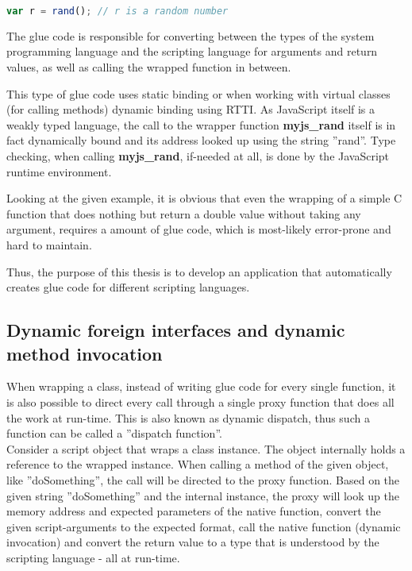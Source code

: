 \begin{lstlisting}[language=JavaScript, caption=Using a C function from SpiderMonkey]
var r = rand();	// r is a random number
\end{lstlisting}

The glue code is responsible for converting between the types of the system programming language and the scripting language for arguments and return values, as well as calling the wrapped function in between.

This type of glue code uses static binding or when working with virtual classes (for calling methods) dynamic binding using RTTI. As JavaScript itself is a weakly typed language, the call to the wrapper function \textbf{myjs\_rand} itself is in fact dynamically bound and its address looked up using the string ''rand''. Type checking, when calling \textbf{myjs\_rand}, if-needed at all, is done by the JavaScript runtime environment.

Looking at the given example, it is obvious that even the wrapping of a simple C function that does nothing but return a double value without taking any argument, requires a  amount of glue code, which is most-likely error-prone and hard to maintain.

Thus, the purpose of this thesis is to develop an application that automatically creates glue code for different scripting languages.

\subsection{Dynamic foreign interfaces and dynamic method invocation}

When wrapping a class, instead of writing glue code for every single function, it is also possible to direct every call through a single proxy function that does all the work at run-time. This is also known as dynamic dispatch, thus such a function can be called a ''dispatch function''. \\

Consider a script object that wraps a class instance. The object internally holds a reference to the wrapped instance. When calling a method of the given object, like ''doSomething'', the call will be directed to the proxy function. Based on the given string ''doSomething'' and the internal instance, the proxy will look up the memory address and expected parameters of the native function, convert the given script-arguments to the expected format, call the native function (dynamic invocation) and convert the return value to a type that is understood by the scripting language - all at run-time.

